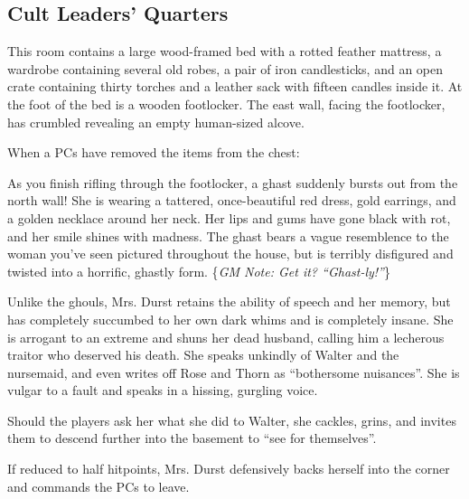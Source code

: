 \subsection{Cult Leaders' Quarters}
\label{sec:CultLeadersQuarters}
\begin{readout}
  This room contains a large wood-framed bed with a rotted feather mattress, a wardrobe containing several old
  robes, a pair of iron candlesticks, and an open crate containing thirty torches and a leather sack with
  fifteen candles inside it. At the foot of the bed is a wooden footlocker. The east wall, facing the footlocker,
  has crumbled revealing an empty human-sized alcove.
\end{readout}
When a PCs have removed the items from the chest:
\begin{readout}
  As you finish rifling through the footlocker, a ghast suddenly bursts out from the north wall! She is wearing
  a tattered, once-beautiful red dress, gold earrings, and a golden necklace around her neck. Her lips and
  gums have gone black with rot, and her smile shines with madness. The ghast bears a vague resemblence to the
  woman you've seen pictured throughout the house, but is terribly disfigured and twisted into a horrific,
  ghastly form. \{\textit{GM Note: Get it? ``Ghast-ly!''}\}
\end{readout}
Unlike the ghouls, Mrs. Durst retains the ability of speech and her memory, but has completely succumbed to
her own dark whims and is completely insane. She is arrogant to an extreme and shuns her dead husband, calling
him a lecherous traitor who deserved his death. She speaks unkindly of Walter and the nursemaid, and even writes
off Rose and Thorn as ``bothersome nuisances''. She is vulgar to a fault and speaks in a hissing, gurgling voice.

Should the players ask her what she did to Walter, she cackles, grins, and invites them to descend further into 
the basement to ``see for themselves''.

If reduced to half hitpoints, Mrs. Durst defensively backs herself into the corner and commands the PCs to leave.

